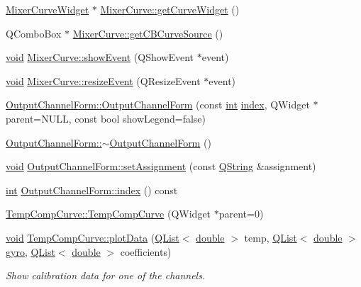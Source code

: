 \begin{DoxyCompactItemize}
\item 
\hyperlink{class_mixer_curve_widget}{Mixer\-Curve\-Widget} $\ast$ \hyperlink{group___config_plugin_ga289025b567020147913c14fbdf51b3d6}{Mixer\-Curve\-::get\-Curve\-Widget} ()
\item 
Q\-Combo\-Box $\ast$ \hyperlink{group___config_plugin_ga8822c0ca3bfdc63eaa942da572b0b8af}{Mixer\-Curve\-::get\-C\-B\-Curve\-Source} ()
\item 
\hyperlink{group___u_a_v_objects_plugin_ga444cf2ff3f0ecbe028adce838d373f5c}{void} \hyperlink{group___config_plugin_ga7ccd9c0dd214329e0801e42b6d2858b9}{Mixer\-Curve\-::show\-Event} (Q\-Show\-Event $\ast$event)
\item 
\hyperlink{group___u_a_v_objects_plugin_ga444cf2ff3f0ecbe028adce838d373f5c}{void} \hyperlink{group___config_plugin_gab7f43f88c7142be2694361b898a0bdc0}{Mixer\-Curve\-::resize\-Event} (Q\-Resize\-Event $\ast$event)
\item 
\hyperlink{group___config_plugin_ga5b19b5a7b71ecffbf0b3f5ac2cbae18d}{Output\-Channel\-Form\-::\-Output\-Channel\-Form} (const \hyperlink{ioapi_8h_a787fa3cf048117ba7123753c1e74fcd6}{int} \hyperlink{glext_8h_ab47dd9958bcadea08866b42bf358e95e}{index}, Q\-Widget $\ast$parent=N\-U\-L\-L, const bool show\-Legend=false)
\item 
\hyperlink{group___config_plugin_ga6b25b9aa17895f0d557626e4dea077dd}{Output\-Channel\-Form\-::$\sim$\-Output\-Channel\-Form} ()
\item 
\hyperlink{group___u_a_v_objects_plugin_ga444cf2ff3f0ecbe028adce838d373f5c}{void} \hyperlink{group___config_plugin_gacdf981958669fa47fe697e39fa529a16}{Output\-Channel\-Form\-::set\-Assignment} (const \hyperlink{group___u_a_v_objects_plugin_gab9d252f49c333c94a72f97ce3105a32d}{Q\-String} \&assignment)
\item 
\hyperlink{ioapi_8h_a787fa3cf048117ba7123753c1e74fcd6}{int} \hyperlink{group___config_plugin_ga04c058165995634381c105cad76f4209}{Output\-Channel\-Form\-::index} () const 
\item 
\hyperlink{group___config_plugin_gadde0ad4527ea2096cecb195d2a635014}{Temp\-Comp\-Curve\-::\-Temp\-Comp\-Curve} (Q\-Widget $\ast$parent=0)
\item 
\hyperlink{group___u_a_v_objects_plugin_ga444cf2ff3f0ecbe028adce838d373f5c}{void} \hyperlink{group___config_plugin_ga19bcca9caf37d6e7360270c37542d1b5}{Temp\-Comp\-Curve\-::plot\-Data} (\hyperlink{class_q_list}{Q\-List}$<$ \hyperlink{_super_l_u_support_8h_a8956b2b9f49bf918deed98379d159ca7}{double} $>$ temp, \hyperlink{class_q_list}{Q\-List}$<$ \hyperlink{_super_l_u_support_8h_a8956b2b9f49bf918deed98379d159ca7}{double} $>$ \hyperlink{_parse_e_k_f_log_8m_ad080000332893e19cac48f8ea3c58647}{gyro}, \hyperlink{class_q_list}{Q\-List}$<$ \hyperlink{_super_l_u_support_8h_a8956b2b9f49bf918deed98379d159ca7}{double} $>$ coefficients)
\begin{DoxyCompactList}\small\item\em Show calibration data for one of the channels. \end{DoxyCompactList}\end{DoxyCompactItemize}
